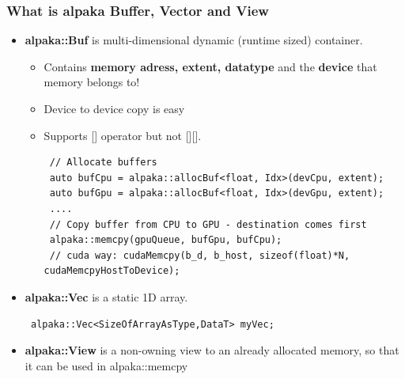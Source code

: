 \documentclass[9pt]{beamer}
\begin{document}
\begin{frame} [fragile]
\frametitle{What is alpaka Buffer, Vector and View}
\begin{itemize}
 \item \textbf{alpaka::Buf} is multi-dimensional dynamic (runtime sized) container.
 \begin{itemize}
 \item Contains \textbf{memory adress, extent, datatype} and the \textbf{device} that memory belongs to!
 \item Device to device copy is easy
 \item Supports [] operator but not [][].
 \lstset{basicstyle=\ttfamily\scriptsize}
 \begin{lstlisting}
 // Allocate buffers
 auto bufCpu = alpaka::allocBuf<float, Idx>(devCpu, extent);
 auto bufGpu = alpaka::allocBuf<float, Idx>(devGpu, extent);
 ....
 // Copy buffer from CPU to GPU - destination comes first
 alpaka::memcpy(gpuQueue, bufGpu, bufCpu);
 // cuda way: cudaMemcpy(b_d, b_host, sizeof(float)*N, cudaMemcpyHostToDevice);
 \end{lstlisting}
 \end{itemize}
 \item \textbf{alpaka::Vec} is a static 1D array.
 \begin{lstlisting}
 alpaka::Vec<SizeOfArrayAsType,DataT> myVec;
 \end{lstlisting}
 \item \textbf{alpaka::View} is a non-owning view to an already allocated memory, so that it can be used in alpaka::memcpy
\end{itemize}
    \end{frame}
\end{document}

